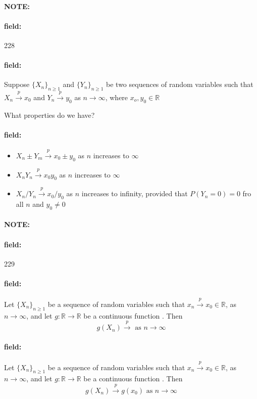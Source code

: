 \documentclass[12pt]{article}
\newenvironment{note}{\paragraph{NOTE:}}{}
\newenvironment{field}{\paragraph{field:}}{}
\begin{document}
\begin{note} \begin{field} \tiny 228 \end{field}
  \begin{field}
     Suppose $\{X_n\}_{n \geq 1}$ and $\{Y_n\}_{n \geq 1}$ be two sequences of random variables such that $X_n \overset{p}{\to} x_0$ and $Y_n \overset{p}{\to} y_0$ as $n \to \infty$, where $x_o, y_0 \in \mathbb{R}$

     What properties do we have?
  \end{field}
  \begin{field}
    \begin{itemize}
      \item $X_n \pm Y_m \overset{p}{\to} x_0 \pm y_0$ as $n$ increases to $\infty$
      \item $X_nY_n \overset{p}{\to} x_0y_0$ as $n$ increases to $\infty$
      \item $X_n/Y_n \overset{p}{\to} x_0/y_0$ as $n$ increases to infinity, provided that $P(Y_n = 0) = 0 $ fro all $n$ and $y_0 \neq 0$
    \end{itemize}
  \end{field}
\end{note}

\begin{note} \begin{field} \tiny 229 \end{field}
  \begin{field}
    Let $\{X_n\}_{n \geq 1}$ be a sequence of random variables such that $x_n \overset{p}{\to} x_0 \in \mathbb{R}$, as $n \to \infty$, and let $g: \mathbb{R} \to \mathbb{R}$ be a continuous function . Then $$g(X_n) \overset{p}{\to}  \text{ as } n \to \infty$$
  \end{field}
  \begin{field}
    Let $\{X_n\}_{n \geq 1}$ be a sequence of random variables such that $x_n \overset{p}{\to} x_0 \in \mathbb{R}$, as $n \to \infty$, and let $g: \mathbb{R} \to \mathbb{R}$ be a continuous function . Then $$g(X_n) \overset{p}{\to} g(x_0) \text{ as } n \to \infty$$
  \end{field}
\end{note}
\end{document}
